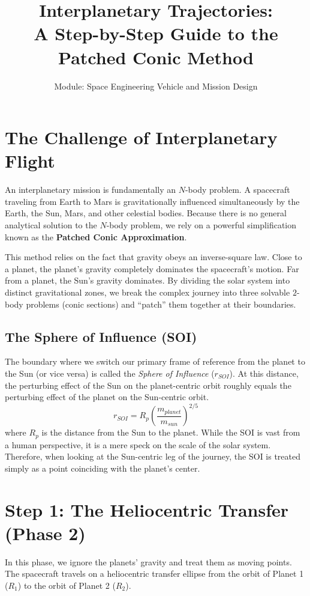 \documentclass[12pt]{article}
\title{\textbf{Interplanetary Trajectories: \\ A Step-by-Step Guide to the Patched Conic Method}}
\author{Module: Space Engineering Vehicle and Mission Design}
\date{}
\begin{document}
\maketitle

\section*{The Challenge of Interplanetary Flight}
An interplanetary mission is fundamentally an $N$-body problem. A spacecraft traveling from Earth to Mars is gravitationally influenced simultaneously by the Earth, the Sun, Mars, and other celestial bodies. Because there is no general analytical solution to the $N$-body problem, we rely on a powerful simplification known as the \textbf{Patched Conic Approximation}.

This method relies on the fact that gravity obeys an inverse-square law. Close to a planet, the planet's gravity completely dominates the spacecraft's motion. Far from a planet, the Sun's gravity dominates. By dividing the solar system into distinct gravitational zones, we break the complex journey into three solvable $2$-body problems (conic sections) and ``patch'' them together at their boundaries.

\vspace{0.5cm}

\subsection*{The Sphere of Influence (SOI)}
The boundary where we switch our primary frame of reference from the planet to the Sun (or vice versa) is called the \textit{Sphere of Influence} ($r_{SOI}$). At this distance, the perturbing effect of the Sun on the planet-centric orbit roughly equals the perturbing effect of the planet on the Sun-centric orbit. 
\begin{equation}
    r_{SOI} = R_p \left( \frac{m_{planet}}{m_{sun}} \right)^{2/5}
\end{equation}
where $R_p$ is the distance from the Sun to the planet. While the SOI is vast from a human perspective, it is a mere speck on the scale of the solar system. Therefore, when looking at the Sun-centric leg of the journey, the SOI is treated simply as a point coinciding with the planet's center.

\newpage

\section*{Step 1: The Heliocentric Transfer (Phase 2)}
In this phase, we ignore the planets' gravity and treat them as moving points. The spacecraft travels on a heliocentric transfer ellipse from the orbit of Planet 1 ($R_1$) to the orbit of Planet 2 ($R_2$). 
\end{document}
